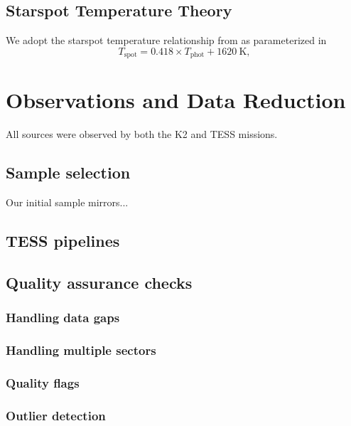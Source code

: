 \documentclass[twocolumn]{aastex631}
\begin{document}
\subsection{Starspot Temperature Theory}
We adopt the starspot temperature relationship from \citet{2005LRSP....2....8B} as parameterized in \citet{2019AJ....157...96R}
\begin{equation}
  T_{\mathrm{spot}} = 0.418 \times T_{\mathrm{phot}} + 1620~\mathrm{K},
  \label{eq:Tspot}
  \end{equation}

\section{Observations and Data Reduction}

All sources were observed by both the K2 \citep{howell14} and TESS \citep{2015JATIS...1a4003R} missions.

\subsection{Sample selection}
Our initial sample mirrors...

\subsection{TESS pipelines}


\subsection{Quality assurance checks}

\subsubsection{Handling data gaps}

\subsubsection{Handling multiple sectors}

\subsubsection{Quality flags}

\subsubsection{Outlier detection}
\end{document}
